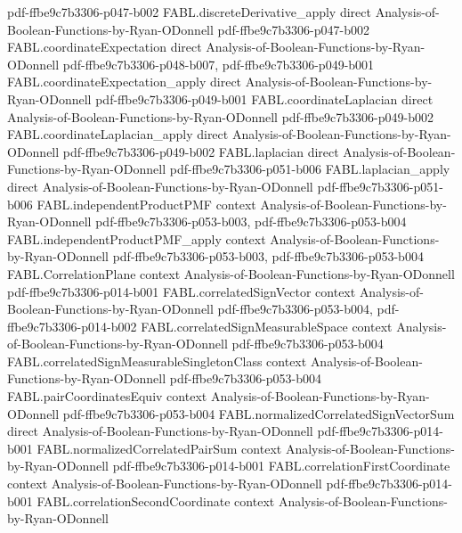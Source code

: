\begin{theorem}
  {pdf-ffbe9c7b3306-p047-b002}
\proofstep
  {FABL.discreteDerivative_apply}
  {direct}
  {Analysis-of-Boolean-Functions-by-Ryan-ODonnell}
  {pdf-ffbe9c7b3306-p047-b002}
\proofstep
  {FABL.coordinateExpectation}
  {direct}
  {Analysis-of-Boolean-Functions-by-Ryan-ODonnell}
  {pdf-ffbe9c7b3306-p048-b007,
    pdf-ffbe9c7b3306-p049-b001}
\proofstep
  {FABL.coordinateExpectation_apply}
  {direct}
  {Analysis-of-Boolean-Functions-by-Ryan-ODonnell}
  {pdf-ffbe9c7b3306-p049-b001}
\proofstep
  {FABL.coordinateLaplacian}
  {direct}
  {Analysis-of-Boolean-Functions-by-Ryan-ODonnell}
  {pdf-ffbe9c7b3306-p049-b002}
\proofstep
  {FABL.coordinateLaplacian_apply}
  {direct}
  {Analysis-of-Boolean-Functions-by-Ryan-ODonnell}
  {pdf-ffbe9c7b3306-p049-b002}
\proofstep
  {FABL.laplacian}
  {direct}
  {Analysis-of-Boolean-Functions-by-Ryan-ODonnell}
  {pdf-ffbe9c7b3306-p051-b006}
\proofstep
  {FABL.laplacian_apply}
  {direct}
  {Analysis-of-Boolean-Functions-by-Ryan-ODonnell}
  {pdf-ffbe9c7b3306-p051-b006}
\proofstep
  {FABL.independentProductPMF}
  {context}
  {Analysis-of-Boolean-Functions-by-Ryan-ODonnell}
  {pdf-ffbe9c7b3306-p053-b003,
    pdf-ffbe9c7b3306-p053-b004}
\proofstep
  {FABL.independentProductPMF_apply}
  {context}
  {Analysis-of-Boolean-Functions-by-Ryan-ODonnell}
  {pdf-ffbe9c7b3306-p053-b003,
    pdf-ffbe9c7b3306-p053-b004}
\proofstep
  {FABL.CorrelationPlane}
  {context}
  {Analysis-of-Boolean-Functions-by-Ryan-ODonnell}
  {pdf-ffbe9c7b3306-p014-b001}
\proofstep
  {FABL.correlatedSignVector}
  {context}
  {Analysis-of-Boolean-Functions-by-Ryan-ODonnell}
  {pdf-ffbe9c7b3306-p053-b004,
    pdf-ffbe9c7b3306-p014-b002}
\proofstep
  {FABL.correlatedSignMeasurableSpace}
  {context}
  {Analysis-of-Boolean-Functions-by-Ryan-ODonnell}
  {pdf-ffbe9c7b3306-p053-b004}
\proofstep
  {FABL.correlatedSignMeasurableSingletonClass}
  {context}
  {Analysis-of-Boolean-Functions-by-Ryan-ODonnell}
  {pdf-ffbe9c7b3306-p053-b004}
\proofstep
  {FABL.pairCoordinatesEquiv}
  {context}
  {Analysis-of-Boolean-Functions-by-Ryan-ODonnell}
  {pdf-ffbe9c7b3306-p053-b004}
\proofstep
  {FABL.normalizedCorrelatedSignVectorSum}
  {direct}
  {Analysis-of-Boolean-Functions-by-Ryan-ODonnell}
  {pdf-ffbe9c7b3306-p014-b001}
\proofstep
  {FABL.normalizedCorrelatedPairSum}
  {context}
  {Analysis-of-Boolean-Functions-by-Ryan-ODonnell}
  {pdf-ffbe9c7b3306-p014-b001}
\proofstep
  {FABL.correlationFirstCoordinate}
  {context}
  {Analysis-of-Boolean-Functions-by-Ryan-ODonnell}
  {pdf-ffbe9c7b3306-p014-b001}
\proofstep
  {FABL.correlationSecondCoordinate}
  {context}
  {Analysis-of-Boolean-Functions-by-Ryan-ODonnell}

\end{theorem}

